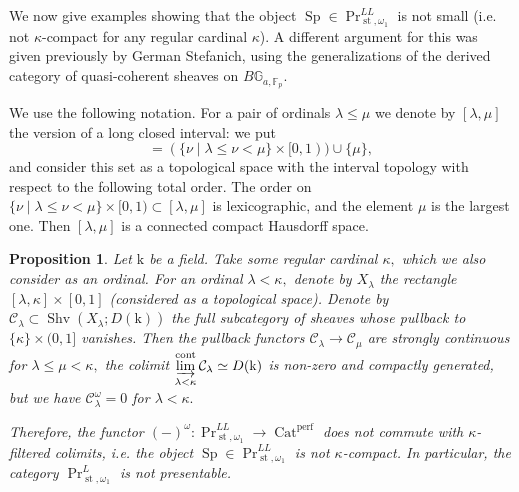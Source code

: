 \documentclass[11pt,leqno]{amsart}
\newtheorem{prop}[theo]{Proposition}
\numberwithin{equation}{section}
\def\bG{\mathbb{G}}
\def\FF{{\mathbb F}}
\newcommand{\indlim}[1][]{\mathop{\varinjlim}\limits_{#1}}
\newcommand{\Cat}{\operatorname{Cat}}
\newcommand{\cont}{\operatorname{cont}}
\newcommand{\st}{\operatorname{st}}
\newcommand{\mk}{\mathrm k}
\newcommand{\cC}{{\mathcal C}}
\newcommand{\perf}{\operatorname{perf}}
\newcommand{\Sh}{\operatorname{Shv}}
\newcommand{\Sp}{\operatorname{Sp}}
\begin{document}
We now give examples showing that the object $\Sp\in\Pr^{LL}_{\st,\omega_1}$ is not small (i.e. not $\kappa$-compact for any regular cardinal $\kappa$). A different argument for this was given previously by German Stefanich, using the generalizations of the derived category of quasi-coherent sheaves on $B\bG_{a,\FF_p}.$  

We use the following notation. For a pair of ordinals $\lambda\leq \mu$ we denote by $[\lambda,\mu]$ the version of a long closed interval: we put
\begin{equation*}
[\lambda,\mu]=(\{\nu\mid \lambda\leq \nu<\mu\}\times [0,1)) \cup\{\mu\},
\end{equation*}
and consider this set as a topological space with the interval topology with respect to the following total order. The order on $\{\nu\mid \lambda\leq \nu<\mu\}\times [0,1)\subset [\lambda,\mu]$ is lexicographic, and the element $\mu$ is the largest one. Then $[\lambda,\mu]$ is a connected compact Hausdorff space.

\begin{prop}\label{prop:compact_objects_in_colimits_of_presentable} Let $\mk$ be a field. Take some regular cardinal $\kappa,$ which we also consider as an ordinal. For an ordinal $\lambda<\kappa,$ denote by $X_{\lambda}$ the rectangle $[\lambda,\kappa]\times [0,1]$ (considered as a topological space). Denote by $\cC_{\lambda}\subset\Sh(X_{\lambda};D(\mk))$ the full subcategory of sheaves whose pullback to $\{\kappa\}\times (0,1]$ vanishes. Then the pullback functors $\cC_{\lambda}\to\cC_{\mu}$ are strongly continuous for $\lambda\leq \mu<\kappa,$ the colimit $\indlim[\lambda<\kappa]^{\cont}\cC_{\lambda}\simeq D(\mk)$ is non-zero and compactly generated, but we have $\cC_{\lambda}^{\omega}=0$ for $\lambda<\kappa.$

Therefore, the functor $(-)^{\omega}:\Pr^{LL}_{\st,\omega_1}\to\Cat^{\perf}$ does not commute with $\kappa$-filtered colimits, i.e. the object $\Sp\in\Pr^{LL}_{\st,\omega_1}$ is not $\kappa$-compact. In particular, the category $\Pr^L_{\st,\omega_1}$ is not presentable.\end{prop}
\end{document}
